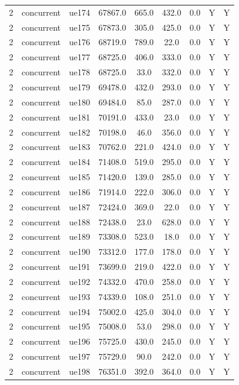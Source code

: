 \begin{table}[ht]
\begin{tabular}{|c|c|c|c|c|c|c|c|c|}
2 & concurrent & ue174 & 67867.0 & 665.0 & 432.0 & 0.0 & Y & Y \\
2 & concurrent & ue175 & 67873.0 & 305.0 & 425.0 & 0.0 & Y & Y \\
2 & concurrent & ue176 & 68719.0 & 789.0 & 22.0 & 0.0 & Y & Y \\
2 & concurrent & ue177 & 68725.0 & 406.0 & 333.0 & 0.0 & Y & Y \\
2 & concurrent & ue178 & 68725.0 & 33.0 & 332.0 & 0.0 & Y & Y \\
2 & concurrent & ue179 & 69478.0 & 432.0 & 293.0 & 0.0 & Y & Y \\
2 & concurrent & ue180 & 69484.0 & 85.0 & 287.0 & 0.0 & Y & Y \\
2 & concurrent & ue181 & 70191.0 & 433.0 & 23.0 & 0.0 & Y & Y \\
2 & concurrent & ue182 & 70198.0 & 46.0 & 356.0 & 0.0 & Y & Y \\
2 & concurrent & ue183 & 70762.0 & 221.0 & 424.0 & 0.0 & Y & Y \\
2 & concurrent & ue184 & 71408.0 & 519.0 & 295.0 & 0.0 & Y & Y \\
2 & concurrent & ue185 & 71420.0 & 139.0 & 285.0 & 0.0 & Y & Y \\
2 & concurrent & ue186 & 71914.0 & 222.0 & 306.0 & 0.0 & Y & Y \\
2 & concurrent & ue187 & 72424.0 & 369.0 & 22.0 & 0.0 & Y & Y \\
2 & concurrent & ue188 & 72438.0 & 23.0 & 628.0 & 0.0 & Y & Y \\
2 & concurrent & ue189 & 73308.0 & 523.0 & 18.0 & 0.0 & Y & Y \\
2 & concurrent & ue190 & 73312.0 & 177.0 & 178.0 & 0.0 & Y & Y \\
2 & concurrent & ue191 & 73699.0 & 219.0 & 422.0 & 0.0 & Y & Y \\
2 & concurrent & ue192 & 74332.0 & 470.0 & 258.0 & 0.0 & Y & Y \\
2 & concurrent & ue193 & 74339.0 & 108.0 & 251.0 & 0.0 & Y & Y \\
2 & concurrent & ue194 & 75002.0 & 425.0 & 304.0 & 0.0 & Y & Y \\
2 & concurrent & ue195 & 75008.0 & 53.0 & 298.0 & 0.0 & Y & Y \\
2 & concurrent & ue196 & 75725.0 & 430.0 & 245.0 & 0.0 & Y & Y \\
2 & concurrent & ue197 & 75729.0 & 90.0 & 242.0 & 0.0 & Y & Y \\
2 & concurrent & ue198 & 76351.0 & 392.0 & 364.0 & 0.0 & Y & Y \\

\end{tabular}
\end{table}
